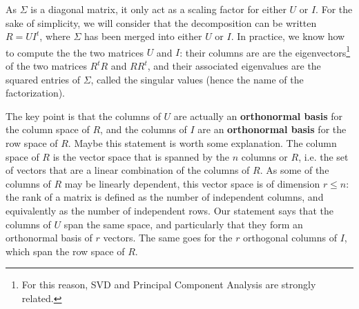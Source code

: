 As $\Sigma$ is a diagonal matrix, it only act as a scaling factor for either $U$ or
$I$. For the sake of simplicity, we will consider that the decomposition can be
written $R = UI^t$, where $\Sigma$ has been merged into either $U$ or $I$. In
practice, we know how to compute the the two matrices $U$ and $I$: their
columns are are the
eigenvectors\footnote{For this reason, SVD and Principal Component Analysis are
strongly related.} of the two matrices $R^tR$ and $RR^t$, and their associated
eigenvalues are the squared entries of $\Sigma$, called the singular values
(hence the name of the factorization).

The key point is that the columns of $U$ are actually an \textbf{orthonormal
basis} for
the column space of $R$, and the columns of $I$ are an \textbf{orthonormal
basis} for the
row space of $R$. Maybe this statement is worth some explanation. The column
space of $R$ is the vector space that is spanned by the $n$ columns or $R$,
i.e. the set of vectors that are a linear combination of the columns of $R$. As
some of the columns of $R$ may be linearly dependent, this vector space is of
dimension $r\leq n$: the rank of a matrix is defined as the number of
independent columns, and equivalently as the number of independent rows. Our
statement says that the columns of $U$ span the same space, and particularly that they form
an orthonormal basis of $r$ vectors. The same goes for the $r$ orthogonal columns
of $I$, which span the row space of $R$.

